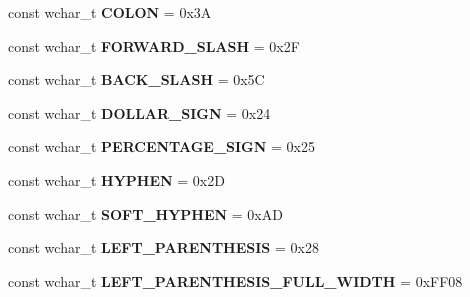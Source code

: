 \begin{DoxyCompactItemize}
\item 
\hypertarget{group___indexing_ga41ddc1b590bfe8f7ac7390447509b528}{const wchar\-\_\-t {\bfseries C\-O\-L\-O\-N} = 0x3\-A}\label{group___indexing_ga41ddc1b590bfe8f7ac7390447509b528}

\item 
\hypertarget{group___indexing_ga6c8d70683ada1d2768778325956ae6a3}{const wchar\-\_\-t {\bfseries F\-O\-R\-W\-A\-R\-D\-\_\-\-S\-L\-A\-S\-H} = 0x2\-F}\label{group___indexing_ga6c8d70683ada1d2768778325956ae6a3}

\item 
\hypertarget{group___indexing_gabeec19e649a1b37059d977cb86000d60}{const wchar\-\_\-t {\bfseries B\-A\-C\-K\-\_\-\-S\-L\-A\-S\-H} = 0x5\-C}\label{group___indexing_gabeec19e649a1b37059d977cb86000d60}

\item 
\hypertarget{group___indexing_ga5bb0ec7c23078477e1de6b34eb5004c7}{const wchar\-\_\-t {\bfseries D\-O\-L\-L\-A\-R\-\_\-\-S\-I\-G\-N} = 0x24}\label{group___indexing_ga5bb0ec7c23078477e1de6b34eb5004c7}

\item 
\hypertarget{group___indexing_gaad197198a2844c42f4dc9503a1c65514}{const wchar\-\_\-t {\bfseries P\-E\-R\-C\-E\-N\-T\-A\-G\-E\-\_\-\-S\-I\-G\-N} = 0x25}\label{group___indexing_gaad197198a2844c42f4dc9503a1c65514}

\item 
\hypertarget{group___indexing_ga5198f496dc83445c18e668682f447a13}{const wchar\-\_\-t {\bfseries H\-Y\-P\-H\-E\-N} = 0x2\-D}\label{group___indexing_ga5198f496dc83445c18e668682f447a13}

\item 
\hypertarget{group___indexing_ga4d2bb55132aae435e573df6d7a5df188}{const wchar\-\_\-t {\bfseries S\-O\-F\-T\-\_\-\-H\-Y\-P\-H\-E\-N} = 0x\-A\-D}\label{group___indexing_ga4d2bb55132aae435e573df6d7a5df188}

\item 
\hypertarget{group___indexing_ga46f83a989464b1843903d63f4bc442b4}{const wchar\-\_\-t {\bfseries L\-E\-F\-T\-\_\-\-P\-A\-R\-E\-N\-T\-H\-E\-S\-I\-S} = 0x28}\label{group___indexing_ga46f83a989464b1843903d63f4bc442b4}

\item 
\hypertarget{group___indexing_ga0b8bd5680f27487ecfa3c99a592d0c17}{const wchar\-\_\-t {\bfseries L\-E\-F\-T\-\_\-\-P\-A\-R\-E\-N\-T\-H\-E\-S\-I\-S\-\_\-\-F\-U\-L\-L\-\_\-\-W\-I\-D\-T\-H} = 0x\-F\-F08}\label{group___indexing_ga0b8bd5680f27487ecfa3c99a592d0c17}


\end{DoxyCompactItemize}
